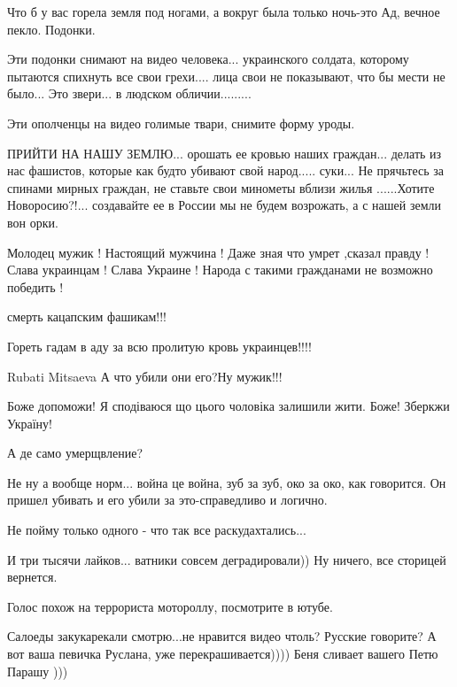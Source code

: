 \begin{itemize}
\begin{multicols}{2}
Что б у вас горела земля под ногами, а вокруг была только ночь-это Ад, вечное
пекло. Подонки.


Эти подонки снимают на видео человека... украинского солдата, которому пытаются
спихнуть все свои грехи.... лица  свои не показывают, что бы мести не было... Это
звери... в людском обличии.........

Эти ополченцы на видео голимые твари, снимите форму уроды.


ПРИЙТИ НА НАШУ ЗЕМЛЮ... орошать ее кровью наших граждан... делать из нас
фашистов, которые как будто убивают свой народ..... суки... Не прячьтесь за
спинами мирных граждан, не ставьте свои минометы вблизи жилья ......Хотите
Новоросию?!... создавайте ее в России мы не будем возрожать, а с нашей земли вон
орки.


Молодец мужик ! Настоящий мужчина ! Даже зная что умрет ,сказал правду ! Слава
украинцам ! Слава Украине !  Народа с такими гражданами не возможно победить !

смерть кацапским фашикам!!!


Гореть гадам в аду за всю  пролитую кровь украинцев!!!!

Rubati Mitsaeva
А что убили они его?Ну мужик!!!

Боже допоможи! Я сподіваюся що цього чоловіка залишили жити.
Боже! Зберкжи Україну!

А де само умерщвление?

Не ну а вообще норм... война це война, зуб за зуб, око за око, как говорится.
Он пришел убивать и его убили за это-справедливо и логично.

Не пойму только одного - что так все раскудахтались...

И три тысячи лайков... ватники совсем деградировали)) Ну ничего, все сторицей вернется.

Голос похож на террориста мотороллу, посмотрите в ютубе.


Салоеды закукарекали смотрю...не нравится видео чтоль? 
Русские говорите? А вот ваша певичка Руслана, уже перекрашивается)))) 
Беня сливает вашего Петю Парашу )))


\end{multicols}
\end{itemize}
